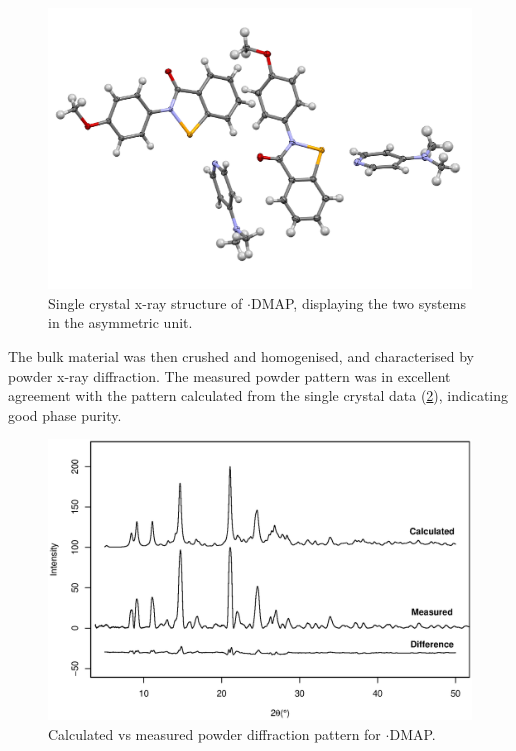 \begin{refsection}
\begin{figure}
  \centering
  \includegraphics[width=0.8\linewidth]{Figures/ebs-4ome-dmap-xray.pdf}
  \caption[Single crystal x-ray structure of \texorpdfstring{$ \cdot $}{.}DMAP.]{Single crystal x-ray structure of $ \cdot $DMAP, displaying the two systems in the asymmetric unit.}\label{fig:ebs-4ome-dmap-xray}
\end{figure}

The bulk material was then crushed and homogenised, and characterised by powder x-ray diffraction.
The measured powder pattern was in excellent agreement with the pattern calculated from the single crystal data (\cref{fig:ebs-4ome-dmap-pdx}), indicating good phase purity.

\begin{figure}
    \centering
    \includegraphics[width=0.9\linewidth]{Figures/ebs-4ome-dmap-pdx.eps}
    \caption{Calculated vs measured powder diffraction pattern for $ \cdot $DMAP.}\label{fig:ebs-4ome-dmap-pdx}
\end{figure}


\end{refsection}
